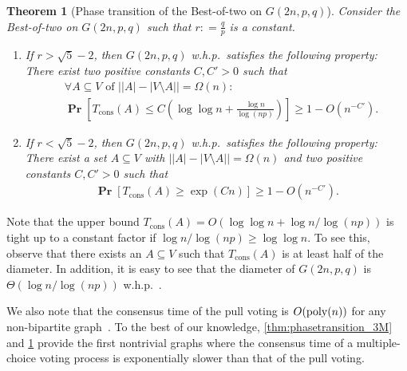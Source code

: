 \documentclass[letterpaper,11pt]{article}
\newtheorem{theorem}{Theorem}[section]
\newcommand{\Tcons}{T_{\mathrm{cons}}}
\renewcommand\Pr{\mathop{\mathbf{Pr}}}
\def\defeq{\mathrel{\mathop:}=}%
\begin{document}
%
\begin{theorem}[Phase transition of the Best-of-two on $G(2n,p,q)$] \label{thm:phasetransition_2C}
Consider the Best-of-two on $G(2n,p,q)$ such that $r\defeq \frac{q}{p}$ is a constant.

\begin{enumerate}[label=(\roman*)]
\item\label{state:abovethroshold_2C}
If $r>\sqrt{5}-2$, then $G(2n,p,q)$ w.h.p.~satisfies the following property:
%
There exist two positive constants $C, C'>0$ such that
\begin{align*}
&\forall A\subseteq V\text{ of $\bigl||A|-|V\setminus A|\bigr|= \Omega(n)$}
:\\
&\Pr\left[\Tcons(A)\leq C\left(\log\log n+\frac{\log n}{\log(np)}\right)\right] \geq 1-O\left(n^{-C'}\right).
\end{align*}

\item\label{state:belowthroshold_2C}
If $r<\sqrt{5}-2$, then $G(2n,p,q)$ w.h.p.~satisfies the following property:
%
There exist a set $A\subseteq V$ with $\bigl||A|-|V\setminus A|\bigr|= \Omega(n)$ and two positive constants $C, C'>0$ such that
\begin{align*}
\Pr\left[\Tcons(A) \geq \exp(Cn) \right] \geq 1-O\left(n^{-C'}\right).
\end{align*}
\end{enumerate}
\end{theorem}
%
Note that the upper bound $\Tcons(A)= O(\log\log n+\log n/\log(np))$ is tight up to a constant factor if $\log n / \log (np) \geq \log\log n$.
To see this, observe that there exists an $A\subseteq V$ such that $\Tcons(A)$ is at least half of the diameter.
In addition, it is easy to see that the diameter of $G(2n,p,q)$ is $\Theta(\log n / \log (np))$ w.h.p.~\cite{FK16}.

We also note that the consensus time of the pull voting is $O({\rm poly}(n))$ for any non-bipartite graph~\cite{HP01}.
To the best of our knowledge, \cref{thm:phasetransition_3M} and \cref{thm:phasetransition_2C} provide the first nontrivial graphs where the consensus time of a multiple-choice voting process is exponentially slower than that of the pull voting. 
\end{document}

